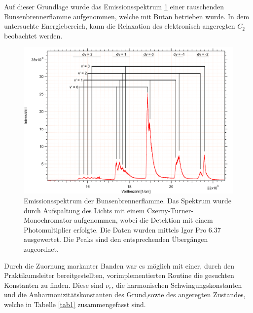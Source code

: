 Auf dieser Grundlage wurde das Emissionsspektrum \ref{Bunsen} einer rauschenden Bunsenbrennerflamme aufgenommen, welche mit Butan betrieben wurde. In dem untersuchte Energiebereich, kann die Relaxation des elektronisch angeregten $C_2$ beobachtet werden.



\begin{figure}[H]
	\centering	
	\begin{minipage}{1\textwidth}
	\includegraphics[width=\columnwidth]{Bilder/Graph3.png}
	\end{minipage}
	
	
	\caption{Emissionsspektrum der Bunsenbrennerflamme. Das Spektrum wurde durch Aufspaltung des Lichts mit einem Czerny-Turner-Monochromator aufgenommen, wobei die Detektion mit einem Photomultiplier erfolgte. Die Daten wurden mittels Igor Pro 6.37 ausgewertet. Die Peaks sind den entsprechenden Übergängen zugeordnet.}
	

	\label{Bunsen}
\end{figure}

Durch die Zuornung  markanter Banden war es möglich mit einer, durch den Praktikumsleiter bereitgestellten, vorimplementierten Routine die gesuchten Konstanten zu finden. Diese sind  $\nu_e$, die harmonischen Schwingungskonstanten und die Anharmonizitätskonstanten des Grund,sowie des angeregten Zustandes, welche in Tabelle  \ref{tab1} zusammengefasst sind.


